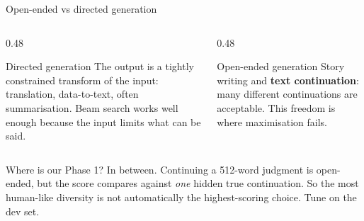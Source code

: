 \documentclass[aspectratio=169,11pt]{beamer}
\begin{document}
\begin{frame}{Open-ended vs directed generation}
  \begin{columns}[T]
    \begin{column}{0.48\textwidth}
      \begin{block}{Directed generation}
        \small
        The output is a tightly constrained transform of the input: translation, data-to-text, often summarisation.
        Beam search works well enough because the input limits what can be said.
      \end{block}
    \end{column}
    \begin{column}{0.48\textwidth}
      \begin{exampleblock}{Open-ended generation}
        \small
        Story writing and \textbf{text continuation}: many different continuations are acceptable. This freedom is where maximisation fails.
      \end{exampleblock}
    \end{column}
  \end{columns}
  \vspace{3mm}
  \begin{alertblock}{Where is our Phase 1?}
    \small
    In between. Continuing a 512-word judgment is open-ended, but the score compares against \emph{one} hidden true continuation. So the most human-like diversity is not automatically the highest-scoring choice. Tune on the dev set.
  \end{alertblock}
\end{frame}
\end{document}
